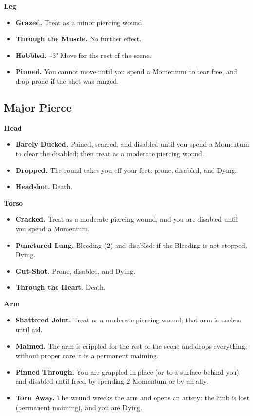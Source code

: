 \textbf{Leg}
\begin{itemize}
    \item[1] \textbf{Grazed.} Treat as a minor piercing wound.
    \item[2] \textbf{Through the Muscle.} No further effect.
    \item[3] \textbf{Hobbled.} --3" Move for the rest of the scene.
    \item[4] \textbf{Pinned.} You cannot move until you spend a Momentum to tear free, and drop prone if the shot was ranged.
\end{itemize}

\subsection{Major Pierce}

\textbf{Head}
\begin{itemize}
    \item[1] \textbf{Barely Ducked.} Pained, scarred, and disabled until you spend a Momentum to clear the disabled; then treat as a moderate piercing wound.
    \item[2] \textbf{Dropped.} The round takes you off your feet: prone, disabled, and Dying.
    \item[3--4] \textbf{Headshot.} Death.
\end{itemize}

\textbf{Torso}
\begin{itemize}
    \item[1] \textbf{Cracked.} Treat as a moderate piercing wound, and you are disabled until you spend a Momentum.
    \item[2] \textbf{Punctured Lung.} Bleeding (2) and disabled; if the Bleeding is not stopped, Dying.
    \item[3] \textbf{Gut-Shot.} Prone, disabled, and Dying.
    \item[4] \textbf{Through the Heart.} Death.
\end{itemize}

\textbf{Arm}
\begin{itemize}
    \item[1] \textbf{Shattered Joint.} Treat as a moderate piercing wound; that arm is useless until aid.
    \item[2] \textbf{Maimed.} The arm is crippled for the rest of the scene and drops everything; without proper care it is a permanent maiming.
    \item[3] \textbf{Pinned Through.} You are grappled in place (or to a surface behind you) and disabled until freed by spending 2 Momentum or by an ally.
    \item[4] \textbf{Torn Away.} The wound wrecks the arm and opens an artery: the limb is lost (permanent maiming), and you are Dying.
\end{itemize}

